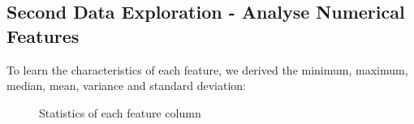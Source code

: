 \documentclass{article}
\begin{document}
\subsection{Second Data Exploration - Analyse Numerical Features}
To learn the characteristics of each feature, we derived the minimum, maximum, median, mean, variance and standard deviation:
\begin{figure}[H]
\centering  
{}
\caption{ Statistics of each feature column}
\label{fig:statistics}
\end{figure}
\end{document}
